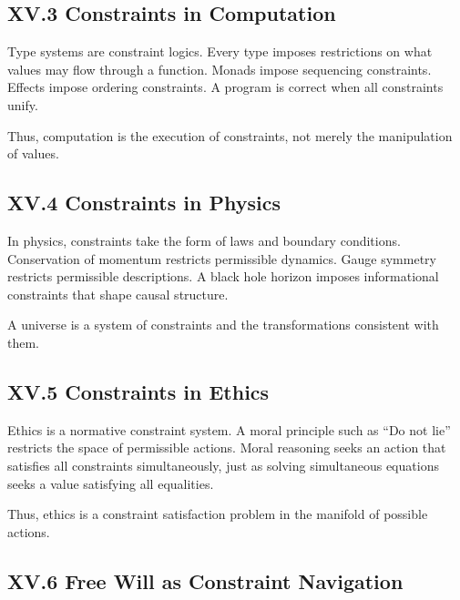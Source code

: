 \documentclass[11pt,letterpaper]{article}
\begin{document}
\subsection{XV.3 Constraints in Computation}

Type systems are constraint logics. Every type imposes restrictions on what values may flow through a function. Monads impose sequencing constraints. Effects impose ordering constraints. A program is correct when all constraints unify.

Thus, computation is the execution of constraints, not merely the manipulation of values.

\subsection{XV.4 Constraints in Physics}

In physics, constraints take the form of laws and boundary conditions. Conservation of momentum restricts permissible dynamics. Gauge symmetry restricts permissible descriptions. A black hole horizon imposes informational constraints that shape causal structure.

A universe is a system of constraints and the transformations consistent with them.

\subsection{XV.5 Constraints in Ethics}

Ethics is a normative constraint system. A moral principle such as ``Do not lie'' restricts the space of permissible actions. Moral reasoning seeks an action that satisfies all constraints simultaneously, just as solving simultaneous equations seeks a value satisfying all equalities.

Thus, ethics is a constraint satisfaction problem in the manifold of possible actions.

\subsection{XV.6 Free Will as Constraint Navigation}
\end{document}
